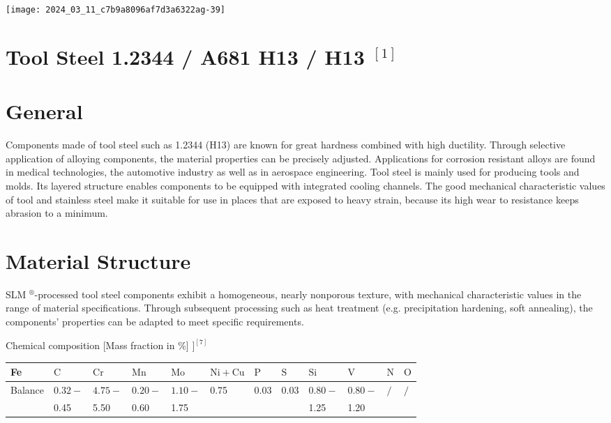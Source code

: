 \documentclass[10pt]{article}
\begin{document}
\begin{center}
\texttt{[image: 2024\_03\_11\_c7b9a8096af7d3a6322ag-39]}
\end{center}

\section*{Tool Steel 1.2344 / A681 H13 / H13 ${ }^{[1]}$}
\section*{General}
Components made of tool steel such as 1.2344 (H13) are known for great hardness combined with high ductility. Through selective application of alloying components, the material properties can be precisely adjusted. Applications for corrosion resistant alloys are found in medical technologies, the automotive industry as well as in aerospace engineering. Tool steel is mainly used for producing tools and molds. Its layered structure enables components to be equipped with integrated cooling channels. The good mechanical characteristic values of tool and stainless steel make it suitable for use in places that are exposed to heavy strain, because its high wear to resistance keeps abrasion to a minimum.

\section*{Material Structure}
SLM $^{\circledR}$-processed tool steel components exhibit a homogeneous, nearly nonporous texture, with mechanical characteristic values in the range of material specifications. Through subsequent processing such as heat treatment (e.g. precipitation hardening, soft annealing), the components' properties can be adapted to meet specific requirements.

Chemical composition [Mass fraction in \%] $]^{[7]}$

\begin{center}
\begin{tabular}{|l|l|l|l|l|l|l|l|l|l|l|l|}
\hline
Fe & $\mathrm{C}$ & $\mathrm{Cr}$ & $\mathrm{Mn}$ & $\mathrm{Mo}$ & $\mathrm{Ni}+\mathrm{Cu}$ & $\mathrm{P}$ & $\mathrm{S}$ & $\mathrm{Si}$ & $\mathrm{V}$ & $\mathrm{N}$ & $\mathrm{O}$ \\
\hline
Balance & $0.32-$ & $4.75-$ & $0.20-$ & $1.10-$ & 0.75 & 0.03 & 0.03 & $0.80-$ & $0.80-$ & $/$ & $/$ \\
 & 0.45 & 5.50 & 0.60 & 1.75 &  &  &  & 1.25 & 1.20 &  &  \\
\hline
\end{tabular}
\end{center}
\end{document}
